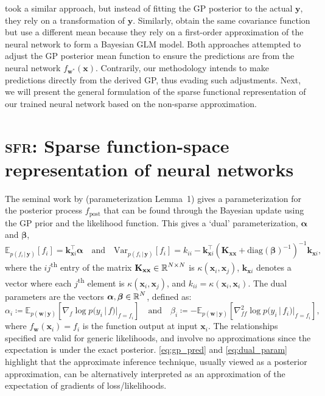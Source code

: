 \documentclass{article}
\renewcommand{\paragraph}[1]{{\bf #1}~~}
\newcommand{\our}{\textsc{sfr}\xspace}
\newcommand{\mathbold}[1]{\bm{#1}}
\newcommand{\mbf}[1]{\mathbf{#1}}
\renewcommand{\mid}{\,|\,}
\newcommand{\valpha}[0]{\mathbold{\alpha}}
\newcommand{\vbeta}[0]{\mathbold{\beta}}
\newcommand{\diag}{\text{{diag}}}
\newcommand{\vx}{\mbf{x}}
\newcommand{\vy}{\mbf{y}}
\newcommand{\vw}{\mbf{w}}
\newcommand{\MKxx}{\mbf{K}_{\mbf{x}\mbf{x}}}
\newcommand{\vk}{\mbf{k}}
\newcommand{\myexpect}{\mathbb{E}}
\begin{document}
%
\citet{khan2019approximate} took a similar approach, but instead of fitting the GP posterior to the actual $\vy$, they rely on a transformation of $\vy$. Similarly, \citet{immer2021improving} obtain the same covariance function but use a different mean because they rely on a first-order approximation of the neural network to form a Bayesian GLM model. Both approaches attempted to adjust the GP posterior mean function to ensure the predictions are from the neural network $f_{\vw^*}(\vx)$. 
Contrarily, our methodology intends to make predictions directly from the derived GP, thus evading such adjustments. Next, we will present the general formulation of the sparse functional representation of our trained neural network based on the non-sparse approximation. 



\section{\our: Sparse function-space representation of neural networks}
The seminal work by \citet{csato2002sparse} (parameterization Lemma~1) gives a parameterization for the posterior process $f_{\textrm{post}}$ that can be found through the Bayesian update using the GP prior and the likelihood function. This gives a `dual' parameterization, $\valpha$ and $\vbeta$,
%
\begin{equation}  \label{eq:gp_pred}
  \myexpect_{p(f_i \mid\vy)}[f_i]= \vk_{\vx i}^\top \valpha \quad \text{and} \quad
  \mathrm{Var}_{p(f_i \mid \vy)}[f_i] = k_{ii} - \vk_{\vx i}^\top ( \MKxx + \diag(\vbeta)^{-1})^{-1} \vk_{\vx i},
\end{equation}
%
where the $ij$\textsuperscript{th} entry of the matrix $\MKxx \in \R^{N \times N}$ is $\kappa(\vx_i,\vx_j)$, $\vk_{\vx i}$ denotes a vector where each $j$\textsuperscript{th} element is $\kappa(\vx_i, \vx_j)$, and $k_{ii} = \kappa(\vx_i, \vx_i)$.  The dual parameters are the vectors $\valpha, \vbeta \in \R^{N}$, defined as:
%
\begin{equation}
  \label{eq:dual_param}
  \alpha_i \coloneqq \myexpect_{p(\vw \mid \vy)}[\nabla_{f}\log p(y_i \mid f) |_{f=f_i}]
  \quad \text{and} \quad
  \beta_i \coloneqq - \myexpect_{p(\vw \mid \vy)}[\nabla^2_{f f}\log p(y_i \mid f_i) |_{f=f_i}],
\end{equation}
%
where $f_\vw(\vx_i) = f_i$ is the function output at input $\vx_i$. The relationships specified are valid for generic likelihoods, and involve no approximations since the expectation is under the exact posterior. \cref{eq:gp_pred} and \cref{eq:dual_param} highlight that the approximate inference technique, usually viewed as a posterior approximation, can be alternatively interpreted as an approximation of the expectation of gradients of loss/likelihoods.
\end{document}
